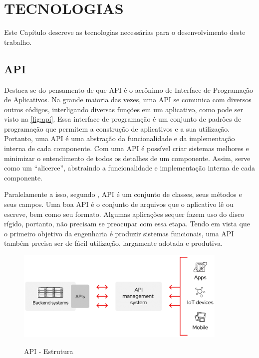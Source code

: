 
\chapter{TECNOLOGIAS}

Este Capítulo descreve as tecnologias necessárias para o desenvolvimento deste trabalho.

\section{API}
Destaca-se do pensamento de  que API é o acrônimo de Interface de Programação de Aplicativos. Na grande maioria das vezes, uma API se comunica com diversos outros códigos, interligando diversas funções em um aplicativo, como pode ser visto na \autoref{fig:api}. Essa interface de programação é um conjunto de padrões de programação que permitem a construção de aplicativos e a sua utilização. Portanto, uma API é uma abstração da funcionalidade e da implementação interna de cada componente. Com uma API é possível criar sistemas melhores e minimizar o entendimento de todos os detalhes de um componente. Assim, serve como um “alicerce”, abstraindo a funcionalidade e implementação interna de cada componente.

Paralelamente a isso, segundo , API é um conjunto de classes, seus métodos e seus campos.
Uma boa API é o conjunto de arquivos que o aplicativo lê ou escreve, bem como seu formato. Algumas aplicações sequer fazem uso do disco rígido, portanto, não precisam se preocupar com essa etapa. Tendo em vista que o primeiro objetivo da engenharia é produzir sistemas funcionais, uma API também precisa ser de fácil utilização, largamente adotada e produtiva. 

\begin{figure}[H]
    \centering
    \caption{API - Estrutura}
    \includegraphics[width=0.9\textwidth]{./dados/figuras/fig10}
    \label{fig:api}
\end{figure}

